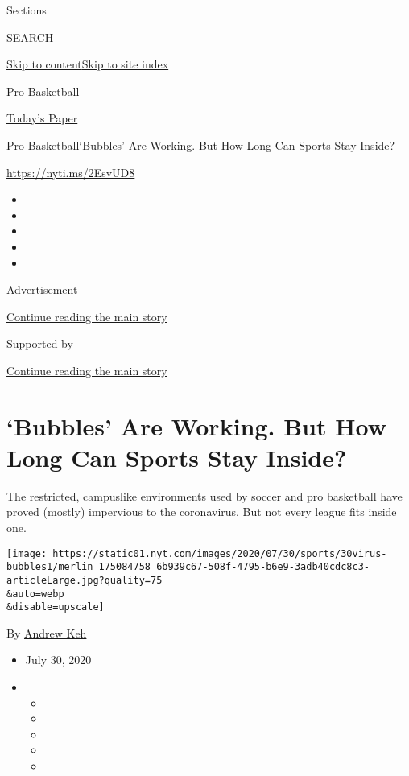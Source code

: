 Sections

SEARCH

\protect\hyperlink{site-content}{Skip to
content}\protect\hyperlink{site-index}{Skip to site index}

\href{https://www.nytimes.com/section/sports/basketball}{Pro Basketball}

\href{https://myaccount.nytimes.com/auth/login?response_type=cookie\&client_id=vi}{}

\href{https://www.nytimes.com/section/todayspaper}{Today's Paper}

\href{/section/sports/basketball}{Pro Basketball}\textbar{}`Bubbles' Are
Working. But How Long Can Sports Stay Inside?

\url{https://nyti.ms/2EsvUD8}

\begin{itemize}
\item
\item
\item
\item
\item
\end{itemize}

Advertisement

\protect\hyperlink{after-top}{Continue reading the main story}

Supported by

\protect\hyperlink{after-sponsor}{Continue reading the main story}

\hypertarget{bubbles-are-working-but-how-long-can-sports-stay-inside}{%
\section{`Bubbles' Are Working. But How Long Can Sports Stay
Inside?}\label{bubbles-are-working-but-how-long-can-sports-stay-inside}}

The restricted, campuslike environments used by soccer and pro
basketball have proved (mostly) impervious to the coronavirus. But not
every league fits inside one.

\texttt{[image: https://static01.nyt.com/images/2020/07/30/sports/30virus-bubbles1/merlin\_175084758\_6b939c67-508f-4795-b6e9-3adb40cdc8c3-articleLarge.jpg?quality=75\\\&auto=webp\\\&disable=upscale]}

By \href{https://www.nytimes.com/by/andrew-keh}{Andrew Keh}

\begin{itemize}
\item
  July 30, 2020
\item
  \begin{itemize}
  \item
  \item
  \item
  \item
  \item
  \end{itemize}
\end{itemize}

